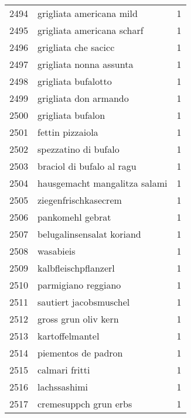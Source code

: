 \begin{tabular}{llr}
2494 &                           grigliata americana mild &      1 \\
2495 &                         grigliata americana scharf &      1 \\
2496 &                               grigliata che sacicc &      1 \\
2497 &                            grigliata nonna assunta &      1 \\
2498 &                                grigliata bufalotto &      1 \\
2499 &                              grigliata don armando &      1 \\
2500 &                                  grigliata bufalon &      1 \\
2501 &                                   fettin pizzaiola &      1 \\
2502 &                               spezzatino di bufalo &      1 \\
2503 &                          braciol di bufalo al ragu &      1 \\
2504 &                      hausgemacht mangalitza salami &      1 \\
2505 &                               ziegenfrischkasecrem &      1 \\
2506 &                                   pankomehl gebrat &      1 \\
2507 &                          belugalinsensalat koriand &      1 \\
2508 &                                          wasabieis &      1 \\
2509 &                               kalbfleischpflanzerl &      1 \\
2510 &                                parmigiano reggiano &      1 \\
2511 &                             sautiert jacobsmuschel &      1 \\
2512 &                               gross grun oliv kern &      1 \\
2513 &                                    kartoffelmantel &      1 \\
2514 &                                piementos de padron &      1 \\
2515 &                                     calmari fritti &      1 \\
2516 &                                       lachssashimi &      1 \\
2517 &                              cremesuppch grun erbs &      1 \\

\end{tabular}

